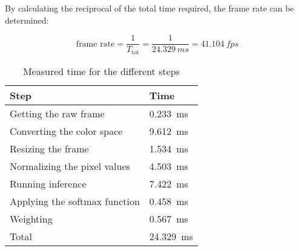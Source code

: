 By calculating the reciprocal of the total time required, the frame rate can be determined:

\begin{equation}
  \text{frame rate} = \frac{1}{T_{\text{tot}}} = \frac{1}{\SI{24.329}{ms}} = \SI{41.104}{fps}
  \label{eq:achieved_framerate}
\end{equation}

\begin{table}
  \caption{Measured time for the different steps}
  \label{tab:measured_times}
  \centering
  \begin{tabular}{ll}
    \toprule
    \textbf{Step} & \textbf{Time} \\
    \midrule
    Getting the raw frame & \SI{0.233}{ms} \\
    Converting the color space & \SI{9.612}{ms} \\
    Resizing the frame & \SI{1.534}{ms} \\
    Normalizing the pixel values & \SI{4.503}{ms} \\
    Running inference & \SI{7.422}{ms} \\
    Applying the softmax function & \SI{0.458}{ms} \\
    Weighting & \SI{0.567}{ms} \\
    \midrule
    Total & \SI{24.329}{ms} \\
    \bottomrule
  \end{tabular}
\end{table}
